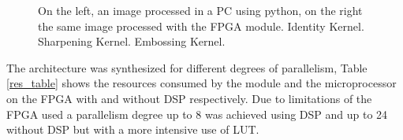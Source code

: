 \documentclass[conference,compsoc]{IEEEtran}
\begin{document}
\begin{figure}[!t]
\centering
{}
\hfil
{}
\hfil
{}
\caption{On the left, an image processed in a PC using python, on the right the
  same image processed with the FPGA module. \protect{}
  Identity Kernel. \protect{} Sharpening Kernel.
  \protect{} Embossing Kernel.}
\label{images_py_po}
\end{figure}



The architecture was synthesized for different degrees of parallelism, Table
\ref{res_table} shows the resources consumed by the module and the
microprocessor on the FPGA with and without DSP respectively. Due to limitations
of the FPGA used a parallelism degree up to 8 was achieved using DSP and up to
24 without DSP but with a more intensive use of LUT.
\end{document}
